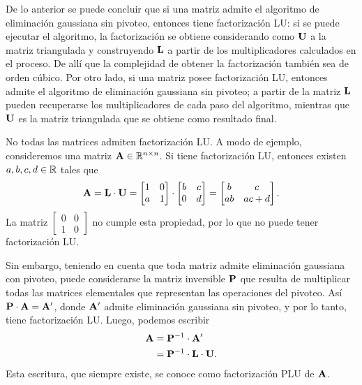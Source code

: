 De lo anterior se puede concluir que si una matriz admite el algoritmo de
eliminación gaussiana sin pivoteo, entonces tiene factorización LU: si se
puede ejecutar el algoritmo, la factorización se obtiene considerando como
$\mathbf{U}$ a la matriz triangulada y construyendo $\mathbf{L}$ a partir de los
multiplicadores calculados en el proceso. De allí que la complejidad de
obtener la factorización también sea de orden cúbico. Por otro lado, si una
matriz posee factorización LU, entonces admite el algoritmo de eliminación
gaussiana sin pivoteo; a partir de la matriz $\mathbf{L}$ pueden recuperarse los
multiplicadores de cada paso del algoritmo, mientras que $\mathbf{U}$ es la
matriz triangulada que se obtiene como resultado final.

No todas las matrices admiten factorización LU. A modo de ejemplo,
consideremos una matriz $\mathbf{A} \in \mathbb{R}^{n \times n}$. Si tiene
factorización LU, entonces existen $a, b, c, d \in \mathbb{R}$ tales que
\[ \mathbf{A} = \mathbf{L} \cdot \mathbf{U} = \begin{bmatrix}
        1 & 0 \\
        a & 1
    \end{bmatrix} \cdot \begin{bmatrix}
        b & c \\
        0 & d
    \end{bmatrix} = \begin{bmatrix}
        b  & c    \\
        ab & ac+d
    \end{bmatrix}. \]
La matriz $\begin{bmatrix} 0 & 0 \\ 1 & 0 \end{bmatrix}$ no cumple esta
propiedad, por lo que no puede tener factorización LU.

Sin embargo, teniendo en cuenta que toda matriz admite eliminación gaussiana
con pivoteo, puede considerarse la matriz inversible $\mathbf{P}$ que resulta de
multiplicar todas las matrices elementales que representan las operaciones
del pivoteo.
Así $\mathbf{P} \cdot \mathbf{A} = \mathbf{A'}$, donde $\mathbf{A'}$ admite eliminación
gaussiana sin pivoteo, y por lo tanto, tiene factorización LU.
Luego, podemos escribir
\[ \begin{aligned}
    \mathbf{A}
    &= \mathbf{P}^{-1} \cdot \mathbf{A'} \\
    &= \mathbf{P}^{-1} \cdot \mathbf{L} \cdot \mathbf{U}.
\end{aligned} \]
Esta escritura, que siempre existe, se conoce como factorización PLU
de $\mathbf{A}$.

